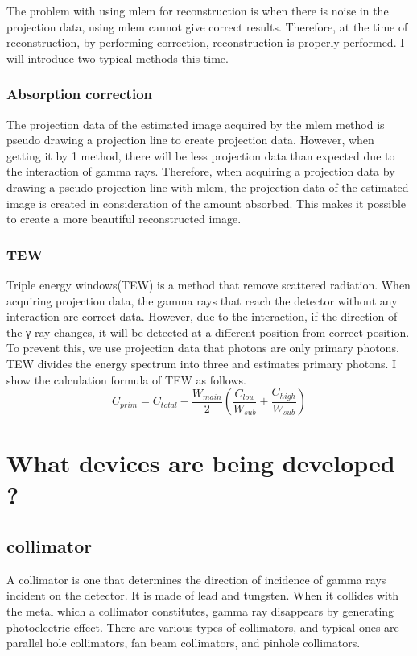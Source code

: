 \documentclass[dvipdfmx,autodetect-engine]{jsarticle}%
\begin{document}
The problem with using mlem for reconstruction is when there is noise in the projection data, using mlem cannot give correct results. Therefore, at the time of reconstruction, by performing correction, reconstruction is properly performed. I will introduce two typical methods this time.
\subsubsection{Absorption correction}
The projection data of the estimated image acquired by the mlem method is pseudo drawing a projection line to create projection data. However, when getting it by 1 method, there will be less projection data than expected due to the interaction of gamma rays. Therefore, when acquiring a projection data by drawing a pseudo projection line with mlem, the projection data of the estimated image is created in consideration of the amount absorbed. This makes it possible to create a more beautiful reconstructed image.
\subsubsection{TEW}
Triple energy windows(TEW) is a method that remove scattered radiation. When acquiring projection data, the gamma rays that reach the detector without any interaction are correct data. However, due to the interaction, if the direction of the γ-ray changes, it will be detected at a different position from correct position. To prevent this, we use projection data that photons are only primary photons. TEW divides the energy spectrum into three and estimates primary photons. I show the calculation formula of TEW as follows.
\[
  C_{prim} = C_{total} - \frac{W_{main}}{2}(\frac{C_{low}}{W_{sub}} + \frac{C_{high}}{W_{sub}})
\]

\section{What devices are being developed ?}
\subsection{collimator}
A collimator is one that determines the direction of incidence of gamma rays incident on the detector. It is made of lead and tungsten. When it collides with the metal which a collimator constitutes, gamma ray disappears by generating photoelectric effect. There are various types of collimators, and typical ones are parallel hole collimators, fan beam collimators, and pinhole collimators.
\end{document}
